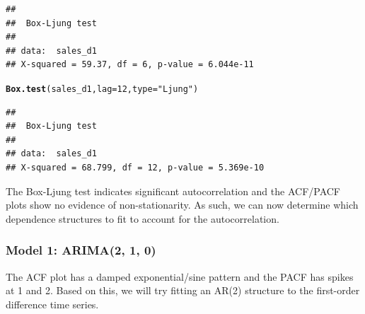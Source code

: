 \documentclass{article}\usepackage[]{graphicx}\usepackage[]{color}
\makeatletter
\newcommand{\hlnum}[1]{\textcolor[rgb]{0.686,0.059,0.569}{#1}}%
\newcommand{\hlstr}[1]{\textcolor[rgb]{0.192,0.494,0.8}{#1}}%
\newcommand{\hlstd}[1]{\textcolor[rgb]{0.345,0.345,0.345}{#1}}%
\newcommand{\hlkwc}[1]{\textcolor[rgb]{0.333,0.667,0.333}{#1}}%
\newcommand{\hlkwd}[1]{\textcolor[rgb]{0.737,0.353,0.396}{\textbf{#1}}}%
\newenvironment{kframe}{%
 \def\at@end@of@kframe{}%
 \ifinner\ifhmode%
  \def\at@end@of@kframe{\end{minipage}}%
  \begin{minipage}{\columnwidth}%
 \fi\fi%
 \def\FrameCommand##1{\hskip\@totalleftmargin \hskip-\fboxsep
 \colorbox{shadecolor}{##1}\hskip-\fboxsep
     \hskip-\linewidth \hskip-\@totalleftmargin \hskip\columnwidth}%
 \MakeFramed {\advance\hsize-\width
   \@totalleftmargin\z@ \linewidth\hsize
   \@setminipage}}%
 {\par\unskip\endMakeFramed%
 \at@end@of@kframe}
\newenvironment{knitrout}{}{} %
\makeatother
\begin{document}
\begin{knitrout}
\begin{kframe}
\begin{verbatim}
## 
## 	Box-Ljung test
## 
## data:  sales_d1
## X-squared = 59.37, df = 6, p-value = 6.044e-11
\end{verbatim}
\begin{alltt}
\hlkwd{Box.test}\hlstd{(sales_d1,} \hlkwc{lag} \hlstd{=} \hlnum{12}\hlstd{,} \hlkwc{type} \hlstd{=} \hlstr{"Ljung"}\hlstd{)}
\end{alltt}
\begin{verbatim}
## 
## 	Box-Ljung test
## 
## data:  sales_d1
## X-squared = 68.799, df = 12, p-value = 5.369e-10
\end{verbatim}
\end{kframe}
\end{knitrout}

The Box-Ljung test indicates significant autocorrelation and the ACF/PACF plots show no evidence of non-stationarity. As such, we can now determine which dependence structures to fit to account for the autocorrelation. 

\subsubsection*{Model 1: ARIMA(2, 1, 0)}

The ACF plot has a damped exponential/sine pattern and the PACF has spikes at 1 and 2. Based on this, we will try fitting an AR(2) structure to the first-order difference time series. 
\end{document}
